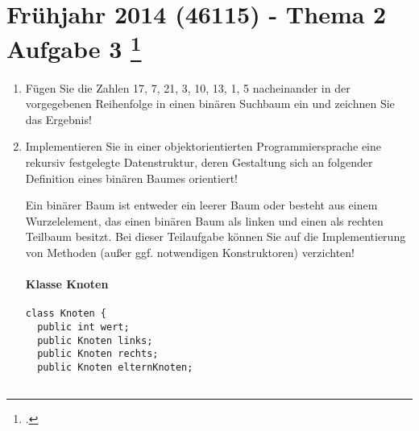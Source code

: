 \documentclass{bschlangaul-aufgabe}
\begin{document}

\section{Frühjahr 2014 (46115) - Thema 2 Aufgabe 3
\footcite{examen:46115:2014:03}}

\begin{enumerate}


\item Fügen Sie die Zahlen 17, 7, 21, 3, 10, 13, 1, 5 nacheinander in
der vorgegebenen Reihenfolge in einen binären Suchbaum ein und zeichnen
Sie das Ergebnis!

\begin{center}
\end{center}


\item Implementieren Sie in einer objektorientierten Programmiersprache
eine rekursiv festgelegte Datenstruktur, deren Gestaltung sich an
folgender Definition eines binären Baumes orientiert!

Ein binärer Baum ist entweder ein leerer Baum oder besteht aus einem
Wurzelelement, das einen binären Baum als linken und einen als rechten
Teilbaum besitzt. Bei dieser Teilaufgabe können Sie auf die
Implementierung von Methoden (außer ggf. notwendigen Konstruktoren)
verzichten!

\paragraph{Klasse Knoten}

\begin{verbatim}
class Knoten {
  public int wert;
  public Knoten links;
  public Knoten rechts;
  public Knoten elternKnoten;


\end{verbatim}
\end{enumerate}
\end{document}

